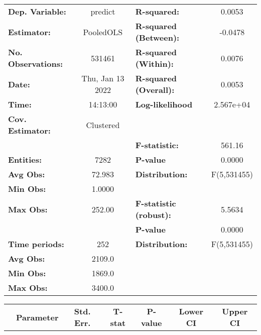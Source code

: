 \begin{center}
\begin{tabular}{lclc}
\toprule
\textbf{Dep. Variable:}    &      predict       & \textbf{  R-squared:         }   &      0.0053      \\
\textbf{Estimator:}        &     PooledOLS      & \textbf{  R-squared (Between):}  &     -0.0478      \\
\textbf{No. Observations:} &       531461       & \textbf{  R-squared (Within):}   &      0.0076      \\
\textbf{Date:}             &  Thu, Jan 13 2022  & \textbf{  R-squared (Overall):}  &      0.0053      \\
\textbf{Time:}             &      14:13:00      & \textbf{  Log-likelihood     }   &    2.567e+04     \\
\textbf{Cov. Estimator:}   &     Clustered      & \textbf{                     }   &                  \\
\textbf{}                  &                    & \textbf{  F-statistic:       }   &      561.16      \\
\textbf{Entities:}         &        7282        & \textbf{  P-value            }   &      0.0000      \\
\textbf{Avg Obs:}          &       72.983       & \textbf{  Distribution:      }   &   F(5,531455)    \\
\textbf{Min Obs:}          &       1.0000       & \textbf{                     }   &                  \\
\textbf{Max Obs:}          &       252.00       & \textbf{  F-statistic (robust):} &      5.5634      \\
\textbf{}                  &                    & \textbf{  P-value            }   &      0.0000      \\
\textbf{Time periods:}     &        252         & \textbf{  Distribution:      }   &   F(5,531455)    \\
\textbf{Avg Obs:}          &       2109.0       & \textbf{                     }   &                  \\
\textbf{Min Obs:}          &       1869.0       & \textbf{                     }   &                  \\
\textbf{Max Obs:}          &       3400.0       & \textbf{                     }   &                  \\
\bottomrule
\end{tabular}
\begin{tabular}{lcccccc}
                & \textbf{Parameter} & \textbf{Std. Err.} & \textbf{T-stat} & \textbf{P-value} & \textbf{Lower CI} & \textbf{Upper CI}  \\

\end{tabular}
\end{center}
